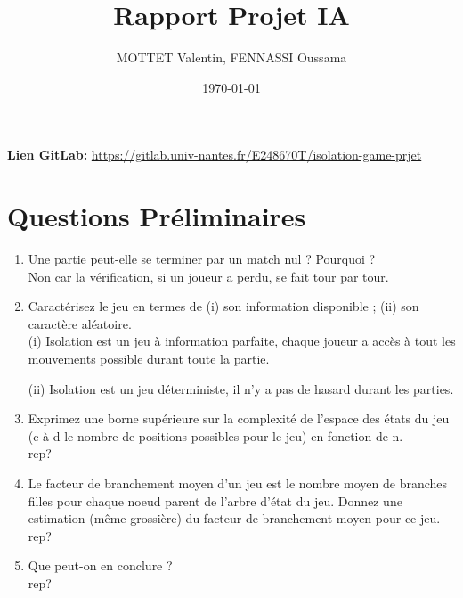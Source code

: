 \documentclass{article}
\begin{document}
	\title{Rapport Projet IA}
	\author{MOTTET Valentin, FENNASSI Oussama}
	\date{\today}
	\maketitle
	
	\textbf{Lien GitLab:} \url{https://gitlab.univ-nantes.fr/E248670T/isolation-game-prjet}
	
	\section{Questions Préliminaires}
	
	\begin{enumerate}
		\item Une partie peut-elle se terminer par un match nul ? Pourquoi ? 
		\\
		
		Non car la vérification, si un joueur a perdu, se fait tour par tour.
		\\
		
		\item Caractérisez le jeu en termes de (i) son information disponible ; (ii) son caractère aléatoire.
		\\
		
		(i) Isolation est un jeu à information parfaite, chaque joueur a accès à tout les mouvements possible durant toute la partie.
		
		(ii) Isolation est un jeu déterministe, il n'y a pas de hasard durant les parties.
		\\
		
		\item Exprimez une borne supérieure sur la complexité de l’espace des états du jeu (c-à-d le nombre de positions possibles pour le jeu) en fonction de n.
		\\
		
		rep?
		\\
		
		\item Le facteur de branchement moyen d’un jeu est le nombre moyen de branches filles pour chaque noeud parent de l’arbre d’état du jeu. Donnez une estimation (même grossière) du facteur de branchement moyen pour ce jeu.
		\\
		
		rep?
		\\
		\item Que peut-on en conclure ?
		\\
		
		rep?
		\\
	
	\end{enumerate}
	
\end{document}
